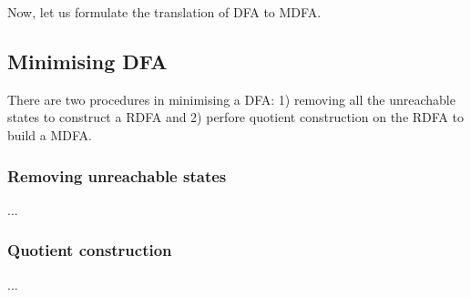 \par Now, let us formulate the translation of DFA to MDFA. 


\subsection{Minimising DFA}
\par There are two procedures in minimising a DFA: 1) removing all the
unreachable states to construct a RDFA and 2) perfore quotient
construction on the RDFA to build a MDFA. 

\subsubsection{Removing unreachable states}
\par ... 

\subsubsection{Quotient construction}
\par ... 